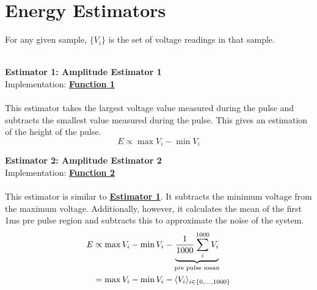 \documentclass[
	letterpaper, %
	10pt, %
]{template}
\begin{document}
\section{Energy Estimators}\label{sec::estimators}
For any given sample, $\{V_i \}$ is the set of voltage readings in that sample.\\\\
\begin{minipage}[t]{.45\textwidth}
{\large\textbf{Estimator 1: Amplitude Estimator 1}~\label{est-1}}\\
Implementation: \textbf{\hyperref[lst-1]{Function 1}}\\\\
This estimator takes the largest voltage value measured during the pulse and subtracts the smallest value measured during the pulse. This gives an estimation of the height of the pulse.
\[E\propto \max{V_i} - \min{V_i}\]
\end{minipage}
\hfill
\begin{minipage}[t]{.45\textwidth}
{\large\textbf{Estimator 2: Amplitude Estimator 2}~\label{est-2}}\\
Implementation: \textbf{\hyperref[lst-2]{Function 2}}\\\\
This estimator is similar to \textbf{\hyperref[est-1]{Estimator 1}}. It subtracts the minimum voltage from the maximum voltage. Additionally, however, it calculates the mean of the first 1ms pre pulse region and subtracts this to approximate the noise of the system.
\begin{align*}
E&\propto \max{V_i} - \min{V_i} - \underbrace{{1\over 1000}\sum_i^{1000} V_i }_{\text {pre pulse mean}} \\ &= \max{V_i} - \min{V_i} - \langle V_i \rangle_{i\in\{0,...,1000\}}
\end{align*}
\end{minipage}\\\\
\end{document}
